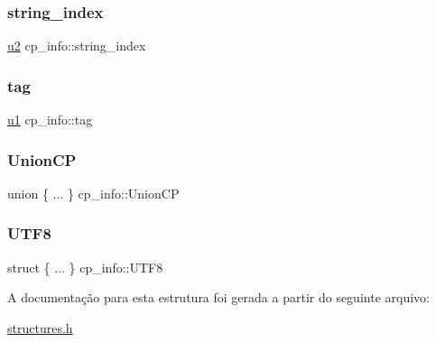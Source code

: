\subsubsection{\texorpdfstring{string\+\_\+index}{string\_index}}
{\footnotesize\ttfamily \hyperlink{lista__operandos_8h_a732cde1300aafb73b0ea6c2558a7a54f}{u2} cp\+\_\+info\+::string\+\_\+index}

\mbox{\label{structcp__info_a045b8801a6e96a2a31d3b62ea684f141}} 
\subsubsection{\texorpdfstring{tag}{tag}}
{\footnotesize\ttfamily \hyperlink{lista__operandos_8h_ad9f4cdb6757615aae2fad89dab3c5470}{u1} cp\+\_\+info\+::tag}

\mbox{\label{structcp__info_aad04019f28f2b6191ace6ab762e051a5}} 
\subsubsection{\texorpdfstring{Union\+CP}{UnionCP}}
{\footnotesize\ttfamily union \{ ... \}  cp\+\_\+info\+::\+Union\+CP}

\mbox{\label{structcp__info_a3a9e08ded40cde605289d41a69978159}} 
\subsubsection{\texorpdfstring{U\+T\+F8}{UTF8}}
{\footnotesize\ttfamily struct \{ ... \}   cp\+\_\+info\+::\+U\+T\+F8}



A documentação para esta estrutura foi gerada a partir do seguinte arquivo\+:\begin{DoxyCompactItemize}
\item 
\hyperlink{structures_8h}{structures.\+h}\end{DoxyCompactItemize}
